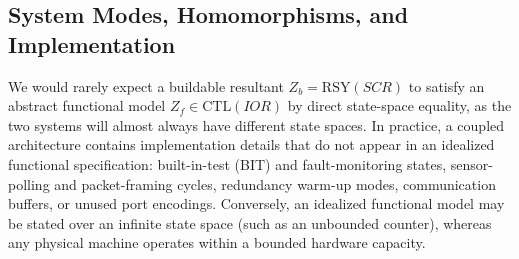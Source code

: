 \subsection{System Modes, Homomorphisms, and Implementation}
\label{sec:background-modes-hom}
We would rarely expect a buildable resultant $Z_b=\mathrm{RSY}(SCR)$ to satisfy an abstract functional model $Z_f\in\mathrm{CTL}(IOR)$ by direct state-space equality, as the two systems will almost always have different state spaces. In practice, a coupled architecture contains implementation details that do not appear in an idealized functional specification: built-in-test (BIT) and fault-monitoring states, sensor-polling and packet-framing cycles, redundancy warm-up modes, communication buffers, or unused port encodings. Conversely, an idealized functional model may be stated over an infinite state space (such as an unbounded counter), whereas any physical machine operates within a bounded hardware capacity.

